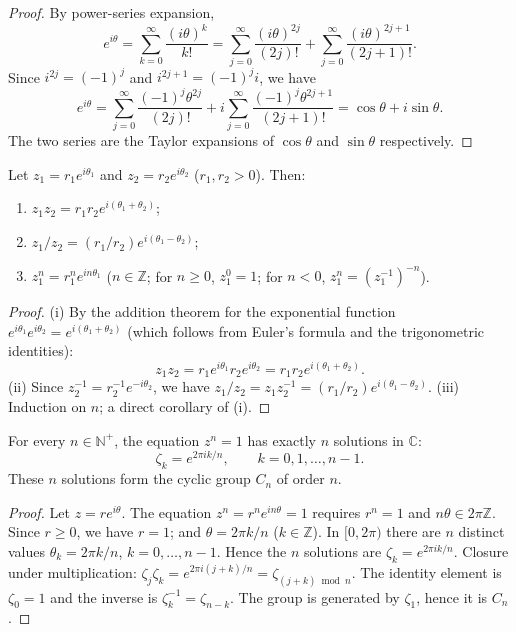 \begin{proof}
By power-series expansion,
\[
e^{i\theta} = \sum_{k=0}^{\infty} \frac{(i\theta)^k}{k!} = \sum_{j=0}^{\infty} \frac{(i\theta)^{2j}}{(2j)!} + \sum_{j=0}^{\infty} \frac{(i\theta)^{2j+1}}{(2j+1)!}.
\]
Since $i^{2j} = (-1)^j$ and $i^{2j+1} = (-1)^j i$, we have
\[
e^{i\theta} = \sum_{j=0}^{\infty} \frac{(-1)^j \theta^{2j}}{(2j)!} + i \sum_{j=0}^{\infty} \frac{(-1)^j \theta^{2j+1}}{(2j+1)!} = \cos\theta + i \sin\theta.
\]
The two series are the Taylor expansions of $\cos\theta$ and $\sin\theta$ respectively.
\end{proof}

\begin{proposition}\label{prop:ca_polar_multiplication}
Let $z_1 = r_1 e^{i\theta_1}$ and $z_2 = r_2 e^{i\theta_2}$ ($r_1, r_2 > 0$). Then:
\begin{enumerate}[label=(\roman*)]
    \item $z_1 z_2 = r_1 r_2 e^{i(\theta_1 + \theta_2)}$;
    \item $z_1 / z_2 = (r_1/r_2) e^{i(\theta_1 - \theta_2)}$;
    \item $z_1^n = r_1^n e^{in\theta_1}$ ($n \in \mathbb{Z}$; for $n \ge 0$, $z_1^0 = 1$; for $n < 0$, $z_1^n = (z_1^{-1})^{-n}$).
\end{enumerate}
\end{proposition}

\begin{proof}
(i) By the addition theorem for the exponential function $e^{i\theta_1} e^{i\theta_2} = e^{i(\theta_1 + \theta_2)}$ (which follows from Euler's formula and the trigonometric identities):
\[
z_1 z_2 = r_1 e^{i\theta_1} r_2 e^{i\theta_2} = r_1 r_2 e^{i(\theta_1 + \theta_2)}.
\]
(ii) Since $z_2^{-1} = r_2^{-1} e^{-i\theta_2}$, we have $z_1 / z_2 = z_1 z_2^{-1} = (r_1/r_2) e^{i(\theta_1 - \theta_2)}$.
(iii) Induction on $n$; a direct corollary of (i).
\end{proof}

\begin{theorem}\label{thm:ca_unit_roots}
For every $n \in \mathbb{N}^+$, the equation $z^n = 1$ has exactly $n$ solutions in $\mathbb{C}$:
\[
\zeta_k = e^{2\pi i k/n}, \qquad k = 0, 1, \dots, n-1.
\]
These $n$ solutions form the cyclic group $C_n$ of order $n$.
\end{theorem}

\begin{proof}
Let $z = re^{i\theta}$. The equation $z^n = r^n e^{in\theta} = 1$ requires $r^n = 1$ and $n\theta \in 2\pi\mathbb{Z}$. Since $r \ge 0$, we have $r = 1$; and $\theta = 2\pi k/n$ ($k \in \mathbb{Z}$). In $[0, 2\pi)$ there are $n$ distinct values $\theta_k = 2\pi k/n$, $k = 0, \dots, n-1$. Hence the $n$ solutions are $\zeta_k = e^{2\pi i k/n}$. Closure under multiplication: $\zeta_j \zeta_k = e^{2\pi i(j+k)/n} = \zeta_{(j+k) \bmod n}$. The identity element is $\zeta_0 = 1$ and the inverse is $\zeta_k^{-1} = \zeta_{n-k}$. The group is generated by $\zeta_1$, hence it is $C_n$.
\end{proof}

